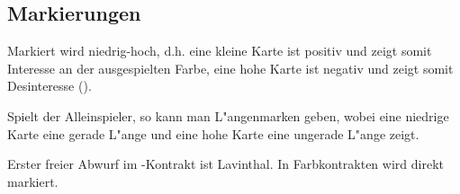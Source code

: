\subsection{Markierungen}

Markiert wird niedrig-hoch, d.h. eine kleine Karte ist positiv und zeigt somit
Interesse an der ausgespielten Farbe, eine hohe Karte ist negativ und zeigt
somit Desinteresse ().

Spielt der Alleinspieler, so kann man L"angenmarken geben, wobei eine niedrige
Karte eine gerade L"ange und eine hohe Karte eine ungerade L"ange zeigt.

Erster freier Abwurf im \sa-Kontrakt ist Lavinthal. In Farbkontrakten wird
direkt markiert.
\raggedbottom

